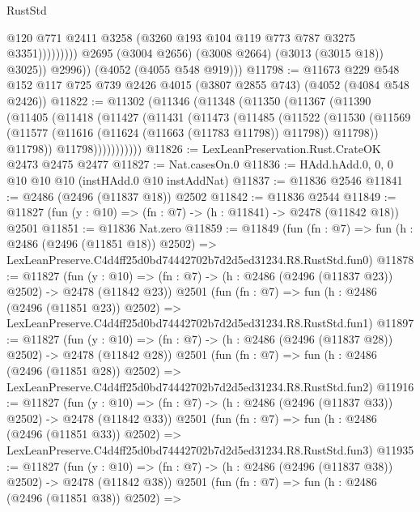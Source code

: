 \begin{lexlean}{RustStd}
\begin{coremodule}
                              @120
                              @771
                              @2411
                              @3258
                              (@3260 @193 @104 @119 @773 @787 @3275 @3351)))))))))
              @2695
              (@3004 @2656)
              (@3008 @2664)
              (@3013 (@3015 @18))
              @3025))
          @2996))
      (@4052 (@4055 @548 @919)))
@11798 := @11673
    @229
    @548
    @152
    @117
    @725
    @739
    @2426
    @4015
    (@3807 @2855 @743)
    (@4052 (@4084 @548 @2426))
@11822 := @11302
    (@11346
      (@11348
        (@11350
          (@11367
            (@11390
              (@11405
                (@11418
                  (@11427
                    (@11431
                      (@11473
                        (@11485
                          (@11522
                            (@11530
                              (@11569
                                (@11577 (@11616 (@11624 (@11663 (@11783 @11798)) @11798)) @11798))
                              @11798))
                          @11798)))))))))))
@11826 := LexLeanPreservation.Rust.CrateOK @2473 @2475 @2477
@11827 := Nat.casesOn.{0}
@11836 := HAdd.hAdd.{0, 0, 0} @10 @10 @10 (instHAdd.{0} @10 instAddNat)
@11837 := @11836 @2546
@11841 := @2486 (@2496 (@11837 @18)) @2502
@11842 := @11836 @2544
@11849 := @11827 (fun (y : @10) => (fn : @7) -> (h : @11841) -> @2478 (@11842 @18)) @2501
@11851 := @11836 Nat.zero
@11859 := @11849
    (fun (fn : @7) =>
    fun (h : @2486 (@2496 (@11851 @18)) @2502) =>
    LexLeanPreserve.C4d4ff25d0bd74442702b7d2d5ed31234.R8.RustStd.fun0)
@11878 := @11827
    (fun (y : @10) => (fn : @7) -> (h : @2486 (@2496 (@11837 @23)) @2502) -> @2478 (@11842 @23))
    @2501
    (fun (fn : @7) =>
    fun (h : @2486 (@2496 (@11851 @23)) @2502) =>
    LexLeanPreserve.C4d4ff25d0bd74442702b7d2d5ed31234.R8.RustStd.fun1)
@11897 := @11827
    (fun (y : @10) => (fn : @7) -> (h : @2486 (@2496 (@11837 @28)) @2502) -> @2478 (@11842 @28))
    @2501
    (fun (fn : @7) =>
    fun (h : @2486 (@2496 (@11851 @28)) @2502) =>
    LexLeanPreserve.C4d4ff25d0bd74442702b7d2d5ed31234.R8.RustStd.fun2)
@11916 := @11827
    (fun (y : @10) => (fn : @7) -> (h : @2486 (@2496 (@11837 @33)) @2502) -> @2478 (@11842 @33))
    @2501
    (fun (fn : @7) =>
    fun (h : @2486 (@2496 (@11851 @33)) @2502) =>
    LexLeanPreserve.C4d4ff25d0bd74442702b7d2d5ed31234.R8.RustStd.fun3)
@11935 := @11827
    (fun (y : @10) => (fn : @7) -> (h : @2486 (@2496 (@11837 @38)) @2502) -> @2478 (@11842 @38))
    @2501
    (fun (fn : @7) =>
    fun (h : @2486 (@2496 (@11851 @38)) @2502) =>

\end{coremodule}
\end{lexlean}
